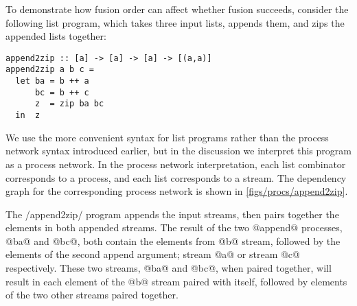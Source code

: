 
To demonstrate how fusion order can affect whether fusion succeeds, consider the following list program, which takes three input lists, appends them, and zips the appended lists together:

\begin{lstlisting}
append2zip :: [a] -> [a] -> [a] -> [(a,a)]
append2zip a b c =
  let ba = b ++ a
      bc = b ++ c
      z  = zip ba bc
  in  z
\end{lstlisting}


We use the more convenient syntax for list programs rather than the process network syntax introduced earlier, but in the discussion we interpret this program as a process network.
In the process network interpretation, each list combinator corresponds to a process, and each list corresponds to a stream.
The dependency graph for the corresponding process network is shown in \cref{figs/procs/append2zip}.



The \Hs/append2zip/ program appends the input streams, then pairs together the elements in both appended streams.
The result of the two @append@ processes, @ba@ and @bc@, both contain the elements from @b@ stream, followed by the elements of the second append argument; stream @a@ or stream @c@ respectively.
These two streams, @ba@ and @bc@, when paired together, will result in each element of the @b@ stream paired with itself, followed by elements of the two other streams paired together.


